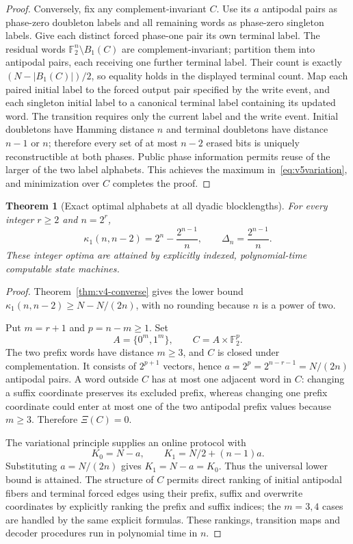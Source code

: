 \documentclass[11pt,a4paper]{article}
\newtheorem{theorem}{Theorem}[section]
\newcommand{\F}{\mathbb F_2}
\begin{document}
\begin{proof}
Conversely, fix any complement-invariant $C$. Use its $a$ antipodal pairs as phase-zero doubleton labels and all remaining words as phase-zero singleton labels. Give each distinct forced phase-one pair its own terminal label. The residual words $\F^n\setminus B_1(C)$ are complement-invariant; partition them into antipodal pairs, each receiving one further terminal label. Their count is exactly $(N-|B_1(C)|)/2$, so equality holds in the displayed terminal count. Map each paired initial label to the forced output pair specified by the write event, and each singleton initial label to a canonical terminal label containing its updated word. The transition requires only the current label and the write event. Initial doubletons have Hamming distance $n$ and terminal doubletons have distance $n-1$ or $n$; therefore every set of at most $n-2$ erased bits is uniquely reconstructible at both phases. Public phase information permits reuse of the larger of the two label alphabets. This achieves the maximum in~\eqref{eq:v5variation}, and minimization over $C$ completes the proof.
\end{proof}

\begin{theorem}[Exact optimal alphabets at all dyadic blocklengths]\label{thm:v5dyadic}
For every integer $r\ge2$ and $n=2^r$,
\begin{equation}\label{eq:v5dyadic}
\boxed{\qquad \kappa_1(n,n-2)=2^n-\frac{2^{n-1}}n,
 \qquad \Delta_n=\frac{2^{n-1}}n.\qquad}
\end{equation}
These integer optima are attained by explicitly indexed, polynomial-time computable state machines.
\end{theorem}
\begin{proof}
Theorem~\ref{thm:v4-converse} gives the lower bound $\kappa_1(n,n-2)\ge N-N/(2n)$, with no rounding because $n$ is a power of two.

Put $m=r+1$ and $p=n-m\ge1$. Set
\[
 A=\{0^m,1^m\},\qquad C=A\times\F^p.
\]
The two prefix words have distance $m\ge3$, and $C$ is closed under complementation. It consists of $2^{p+1}$ vectors, hence $a=2^p=2^{n-r-1}=N/(2n)$ antipodal pairs. A word outside $C$ has at most one adjacent word in $C$: changing a suffix coordinate preserves its excluded prefix, whereas changing one prefix coordinate could enter at most one of the two antipodal prefix values because $m\ge3$. Therefore $\Xi(C)=0$.

The variational principle supplies an online protocol with
\[
 K_0=N-a,\qquad K_1=N/2+(n-1)a.
\]
Substituting $a=N/(2n)$ gives $K_1=N-a=K_0$. Thus the universal lower bound is attained. The structure of $C$ permits direct ranking of initial antipodal fibers and terminal forced edges using their prefix, suffix and overwrite coordinates by explicitly ranking the prefix and suffix indices; the $m=3,4$ cases are handled by the same explicit formulas. These rankings, transition maps and decoder procedures run in polynomial time in $n$.
\end{proof}
\end{document}

